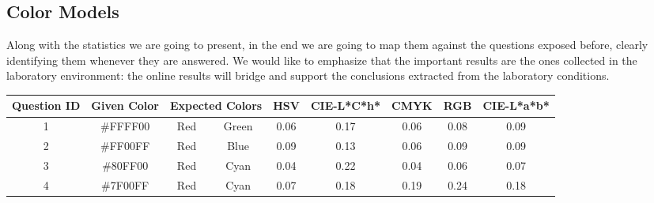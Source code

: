 \subsection{Color Models}
\label{subsec:results_colormodels}
%
Along with the statistics we are going to present, in the end we are going to map them against the questions exposed before, clearly identifying them whenever they are answered. We would like to emphasize that the important
results are the ones collected in the laboratory environment: the online results will bridge and support the conclusions extracted from the laboratory conditions. \par
\begin{table}[htbp]
  \resizebox{\textwidth}{!} {
  \begin{tabular}{@{}ccccccccc@{}}
    \toprule
    Question ID              & Given Color                                           & \multicolumn{2}{c}{Expected Colors}                         & HSV                                & CIE-L*C*h*                        & CMYK                               & RGB                                & CIE-L*a*b*                         \\ \midrule
    \multicolumn{1}{|c|}{1}  & \multicolumn{1}{c|}{\cellcolor[HTML]{FFFF00}\#FFFF00} & \multicolumn{1}{c|}{Red}     & \multicolumn{1}{c||}{Green}   & \multicolumn{1}{c|}{0.06}          & \multicolumn{1}{c|}{0.17}         & \multicolumn{1}{c|}{0.06}          & \multicolumn{1}{c|}{0.08}          & \multicolumn{1}{c|}{0.09}          \\ \midrule
    \multicolumn{1}{|c|}{2}  & \multicolumn{1}{c|}{\cellcolor[HTML]{FF00FF}\#FF00FF} & \multicolumn{1}{c|}{Red}     & \multicolumn{1}{c||}{Blue}    & \multicolumn{1}{c|}{0.09}          & \multicolumn{1}{c|}{0.13}         & \multicolumn{1}{c|}{0.06}          & \multicolumn{1}{c|}{0.09}          & \multicolumn{1}{c|}{0.09}          \\ \midrule
    \multicolumn{1}{|c|}{3}  & \multicolumn{1}{c|}{\cellcolor[HTML]{80FF00}\#80FF00} & \multicolumn{1}{c|}{Red}     & \multicolumn{1}{c||}{Cyan}    & \multicolumn{1}{c|}{0.04}          & \multicolumn{1}{c|}{0.22}         & \multicolumn{1}{c|}{0.04}          & \multicolumn{1}{c|}{0.06}          & \multicolumn{1}{c|}{0.07}          \\ \midrule
    \multicolumn{1}{|c|}{4}  & \multicolumn{1}{c|}{\cellcolor[HTML]{7F00FF}\#7F00FF} & \multicolumn{1}{c|}{Red}     & \multicolumn{1}{c||}{Cyan}    & \multicolumn{1}{c|}{0.07}          & \multicolumn{1}{c|}{0.18}         & \multicolumn{1}{c|}{0.19}          & \multicolumn{1}{c|}{0.24}          & \multicolumn{1}{c|}{0.18}          \\ \midrule

\end{tabular}}
\end{table}
